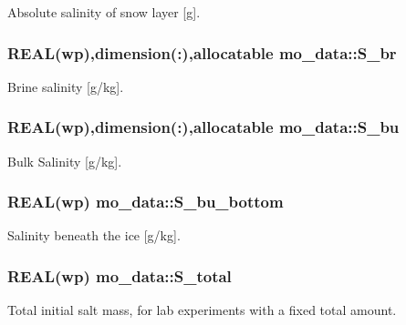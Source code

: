 Absolute salinity of snow layer \mbox{[}g\mbox{]}. 

\hypertarget{namespacemo__data_aa70fa9ad64d25cd4c15584fbc834d820}{
\subsubsection[{S\_\-br}]{\setlength{\rightskip}{0pt plus 5cm}REAL(wp),dimension(:),allocatable {\bf mo\_\-data::S\_\-br}}}
\label{namespacemo__data_aa70fa9ad64d25cd4c15584fbc834d820}


Brine salinity \mbox{[}g/kg\mbox{]}. 

\hypertarget{namespacemo__data_a24861c159e2b136fb56a61bc9f2de7a7}{
\subsubsection[{S\_\-bu}]{\setlength{\rightskip}{0pt plus 5cm}REAL(wp),dimension(:),allocatable {\bf mo\_\-data::S\_\-bu}}}
\label{namespacemo__data_a24861c159e2b136fb56a61bc9f2de7a7}


Bulk Salinity \mbox{[}g/kg\mbox{]}. 

\hypertarget{namespacemo__data_ad14bbccac75eb3a3d95f57d0ecb81816}{
\subsubsection[{S\_\-bu\_\-bottom}]{\setlength{\rightskip}{0pt plus 5cm}REAL(wp) {\bf mo\_\-data::S\_\-bu\_\-bottom}}}
\label{namespacemo__data_ad14bbccac75eb3a3d95f57d0ecb81816}


Salinity beneath the ice \mbox{[}g/kg\mbox{]}. 

\hypertarget{namespacemo__data_a48908c6562a2cb9ef6b51897c4c27716}{
\subsubsection[{S\_\-total}]{\setlength{\rightskip}{0pt plus 5cm}REAL(wp) {\bf mo\_\-data::S\_\-total}}}
\label{namespacemo__data_a48908c6562a2cb9ef6b51897c4c27716}


Total initial salt mass, for lab experiments with a fixed total amount. 

